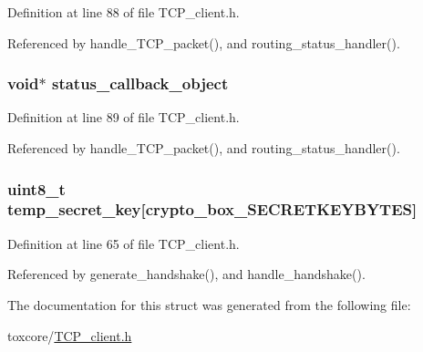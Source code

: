 Definition at line 88 of file T\+C\+P\+\_\+client.\+h.



Referenced by handle\+\_\+\+T\+C\+P\+\_\+packet(), and routing\+\_\+status\+\_\+handler().

\hypertarget{struct_t_c_p___client___connection_a73f125475af5ebdac27d2c2a9060039b}{
\subsubsection[{status\+\_\+callback\+\_\+object}]{\setlength{\rightskip}{0pt plus 5cm}void$\ast$ status\+\_\+callback\+\_\+object}}\label{struct_t_c_p___client___connection_a73f125475af5ebdac27d2c2a9060039b}


Definition at line 89 of file T\+C\+P\+\_\+client.\+h.



Referenced by handle\+\_\+\+T\+C\+P\+\_\+packet(), and routing\+\_\+status\+\_\+handler().

\hypertarget{struct_t_c_p___client___connection_a6de303feb7b7892cc6a38228554b3e78}{
\subsubsection[{temp\+\_\+secret\+\_\+key}]{\setlength{\rightskip}{0pt plus 5cm}uint8\+\_\+t temp\+\_\+secret\+\_\+key\mbox{[}crypto\+\_\+box\+\_\+\+S\+E\+C\+R\+E\+T\+K\+E\+Y\+B\+Y\+T\+E\+S\mbox{]}}}\label{struct_t_c_p___client___connection_a6de303feb7b7892cc6a38228554b3e78}


Definition at line 65 of file T\+C\+P\+\_\+client.\+h.



Referenced by generate\+\_\+handshake(), and handle\+\_\+handshake().



The documentation for this struct was generated from the following file\+:\begin{DoxyCompactItemize}
\item 
toxcore/\hyperlink{_t_c_p__client_8h}{T\+C\+P\+\_\+client.\+h}\end{DoxyCompactItemize}
